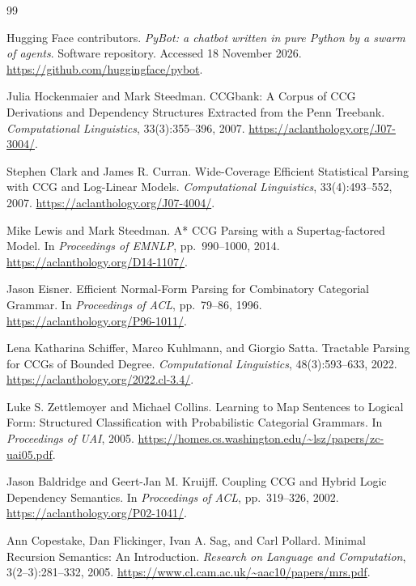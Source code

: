 \documentclass[11pt,a4paper]{article}
\begin{document}
\clearpage
{}
{}
\begingroup
\setlength{\parskip}{0pt}
\begin{thebibliography}{99}
\small\raggedright
\setlength{\itemsep}{3pt}
Hugging Face contributors.
\emph{PyBot: a chatbot written in pure Python by a swarm of agents}.
Software repository. Accessed 18 November 2026.
\url{https://github.com/huggingface/pybot}.

Julia Hockenmaier and Mark Steedman.
CCGbank: A Corpus of CCG Derivations and Dependency Structures Extracted
from the Penn Treebank.
\emph{Computational Linguistics}, 33(3):355--396, 2007.
\url{https://aclanthology.org/J07-3004/}.

Stephen Clark and James R. Curran.
Wide-Coverage Efficient Statistical Parsing with CCG and Log-Linear Models.
\emph{Computational Linguistics}, 33(4):493--552, 2007.
\url{https://aclanthology.org/J07-4004/}.

Mike Lewis and Mark Steedman.
A* CCG Parsing with a Supertag-factored Model.
In \emph{Proceedings of EMNLP}, pp.\ 990--1000, 2014.
\url{https://aclanthology.org/D14-1107/}.

Jason Eisner.
Efficient Normal-Form Parsing for Combinatory Categorial Grammar.
In \emph{Proceedings of ACL}, pp.\ 79--86, 1996.
\url{https://aclanthology.org/P96-1011/}.

Lena Katharina Schiffer, Marco Kuhlmann, and Giorgio Satta.
Tractable Parsing for CCGs of Bounded Degree.
\emph{Computational Linguistics}, 48(3):593--633, 2022.
\url{https://aclanthology.org/2022.cl-3.4/}.

Luke S. Zettlemoyer and Michael Collins.
Learning to Map Sentences to Logical Form: Structured Classification with
Probabilistic Categorial Grammars.
In \emph{Proceedings of UAI}, 2005.
\url{https://homes.cs.washington.edu/~lsz/papers/zc-uai05.pdf}.

Jason Baldridge and Geert-Jan M. Kruijff.
Coupling CCG and Hybrid Logic Dependency Semantics.
In \emph{Proceedings of ACL}, pp.\ 319--326, 2002.
\url{https://aclanthology.org/P02-1041/}.

Ann Copestake, Dan Flickinger, Ivan A. Sag, and Carl Pollard.
Minimal Recursion Semantics: An Introduction.
\emph{Research on Language and Computation}, 3(2--3):281--332, 2005.
\url{https://www.cl.cam.ac.uk/~aac10/papers/mrs.pdf}.


\end{thebibliography}
\end{document}
